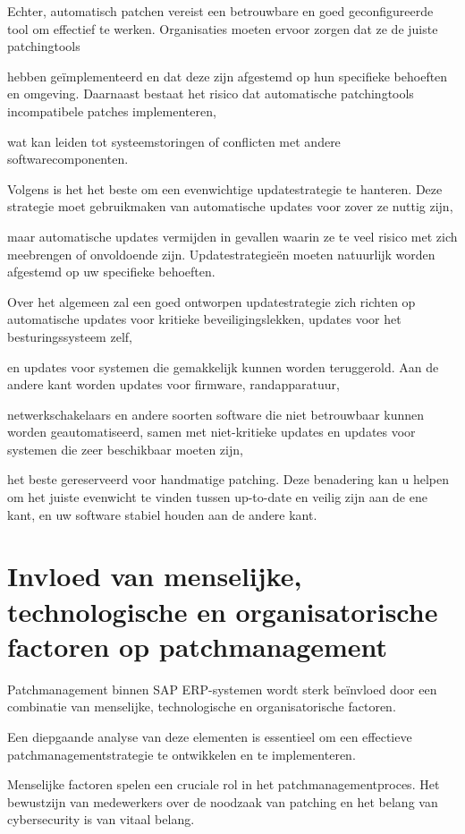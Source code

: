 Echter, automatisch patchen vereist een betrouwbare en goed geconfigureerde tool om effectief te werken. Organisaties moeten ervoor zorgen dat ze de juiste patchingtools

hebben geïmplementeerd en dat deze zijn afgestemd op hun specifieke behoeften en omgeving. Daarnaast bestaat het risico dat automatische patchingtools incompatibele patches implementeren,

wat kan leiden tot systeemstoringen of conflicten met andere softwarecomponenten.

Volgens \textcite{Tozzi2017} is het het beste om een evenwichtige updatestrategie te hanteren. Deze strategie moet gebruikmaken van automatische updates voor zover ze nuttig zijn,

maar automatische updates vermijden in gevallen waarin ze te veel risico met zich meebrengen of onvoldoende zijn. Updatestrategieën moeten natuurlijk worden afgestemd op uw specifieke behoeften. 

Over het algemeen zal een goed ontworpen updatestrategie zich richten op automatische updates voor kritieke beveiligingslekken, updates voor het besturingssysteem zelf,

en updates voor systemen die gemakkelijk kunnen worden teruggerold. Aan de andere kant worden updates voor firmware, randapparatuur,

netwerkschakelaars en andere soorten software die niet betrouwbaar kunnen worden geautomatiseerd, samen met niet-kritieke updates en updates voor systemen die zeer beschikbaar moeten zijn,

het beste gereserveerd voor handmatige patching. Deze benadering kan u helpen om het juiste evenwicht te vinden tussen up-to-date en veilig zijn aan de ene kant, en uw software stabiel houden aan de andere kant.


\section{Invloed van menselijke, technologische en organisatorische factoren op patchmanagement}

Patchmanagement binnen SAP ERP-systemen wordt sterk beïnvloed door een combinatie van menselijke, technologische en organisatorische factoren. 

Een diepgaande analyse van deze elementen is essentieel om een effectieve patchmanagementstrategie te ontwikkelen en te implementeren.

Menselijke factoren spelen een cruciale rol in het patchmanagementproces. Het bewustzijn van medewerkers over de noodzaak van patching en het belang van cybersecurity is van vitaal belang.

